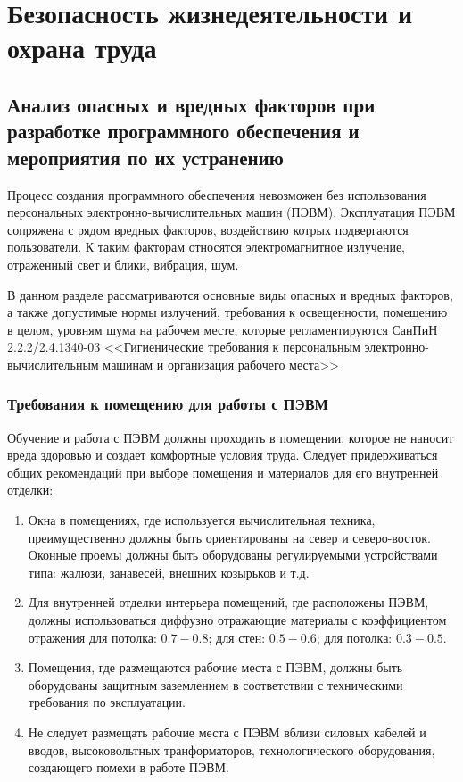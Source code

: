 \chapter{Безопасность жизнедеятельности и охрана труда}
\label{cha:ecolog}

\section{Анализ опасных и вредных факторов при разработке программного
	обеспечения и мероприятия по их устранению}
Процесс создания программного обеспечения невозможен без использования
персональных электронно-вычислительных машин (ПЭВМ). Эксплуатация ПЭВМ
сопряжена с рядом вредных факторов, воздействию котрых подвергаются
пользователи. К таким факторам относятся электромагнитное излучение,
отраженный свет и блики, вибрация, шум.

В данном разделе рассматриваются основные виды опасных и вредных факторов, а
также допустимые нормы излучений, требования к освещенности, помещению в
целом, уровням шума на рабочем месте, которые регламентируются СанПиН
2.2.2/2.4.1340-03 <<Гигиенические требования к персональным
электронно-вычислительным машинам и организация рабочего места>>

\subsection{Требования к помещению для работы с ПЭВМ}
Обучение и работа с ПЭВМ должны проходить в помещении, которое не наносит
вреда здоровью и создает комфортные условия труда. Следует придерживаться
общих рекомендаций при выборе помещения и материалов для его внутренней
отделки:
\begin{enumerate}
\item Окна в помещениях, где используется вычислительная техника,
	преимущественно должны быть ориентированы на север и северо-восток.
	Оконные проемы должны быть оборудованы регулируемыми устройствами
	типа: жалюзи, занавесей, внешних козырьков и т.д.

\item Для внутренней отделки интерьера помещений, где расположены ПЭВМ, должны
	использоваться диффузно отражающие материалы с коэффициентом отражения
	для потолка: $0.7 - 0.8$; для стен: $0.5 - 0.6$; для потолка: $0.3 -
	0.5$.
\item Помещения, где размещаются рабочие места с ПЭВМ, должны быть оборудованы
	защитным заземлением в соответствии с техническими требования по
	эксплуатации.
\item Не следует размещать рабочие места с ПЭВМ вблизи силовых кабелей и
	вводов, высоковольтных транформаторов, технологического оборудования,
	создающего помехи в работе ПЭВМ.
\end{enumerate}


